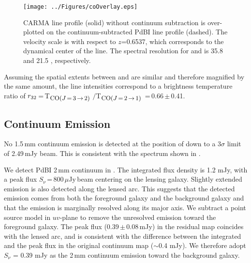 \documentclass[]{emulateapj}
\begin{document}
\begin{figure}[!Htbp]
\texttt{[image: ../Figures/coOverlay.eps]}
\caption{CARMA \cco line profile (solid) without continuum subtraction is
over-plotted on the continuum-subtracted PdBI \bco line profile (dashed).
The velocity scale is with respect to $z$=0.6537, which corresponds to the
dynamical center of the \bco line. The spectral resolution for \cco and \bco
is 35.8 \kms and 21.5 \kms, respectively.
 \label{fig:co32spec}}
\end{figure}

Assuming the spatial extents between \bco and \cco are similar and therefore
magnified by the same amount, the line intensities
correspond to a brightness temperature ratio of
$r_{\rm 32}$\,=\,T$_{\small \mbox{CO($J$\,=\,3\,$\rightarrow$\,2) }}$$/$T$_{\small \mbox{CO($J$\,=\,2\,$\rightarrow$\,1) }}$\,=\,0.66\,$\pm$\,0.41.

\subsection{Continuum Emission} %
No 1.5\,mm continuum emission is detected at the position of \cco
down to a 3$\sigma$ limit of 2.49\,mJy beam\pmOne.
This is consistent with the spectrum shown in .

We detect PdBI 2\,mm continuum in . The integrated flux density is
1.2 mJy, with a peak flux
$S_\nu$\,=\,800\,$\mu$Jy\,beam\pmOne
centering on the lensing galaxy. Slightly extended emission is also detected
along the lensed arc. This suggests that the detected emission comes from
both the foreground galaxy and the background galaxy and that the
emission is marginally resolved along its major axis.
We subtract a point source model in $uv$-plane to remove the unresolved
emission toward the foreground galaxy. The peak flux (0.39\,$\pm$\,0.08\,mJy)
in the residual map coincides with the lensed arc, and is consistent with
the difference between the integrated and the peak flux in the
original continuum map ($\sim$0.4 mJy). We therefore adopt
$S_\nu$ = 0.39 mJy as the 2\,mm continuum emission toward
the background galaxy.
\end{document}
